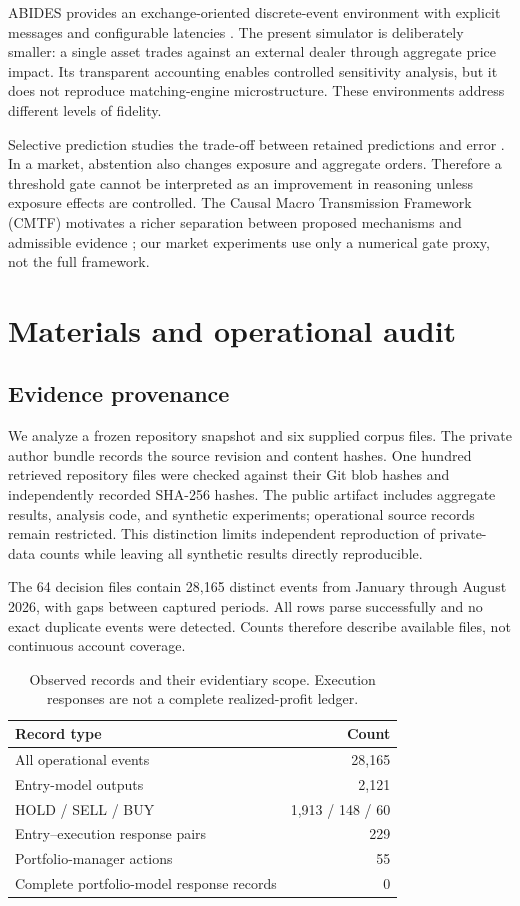 ABIDES provides an exchange-oriented discrete-event environment with explicit messages and configurable latencies \citep{byrd2019abides}. The present simulator is deliberately smaller: a single asset trades against an external dealer through aggregate price impact. Its transparent accounting enables controlled sensitivity analysis, but it does not reproduce matching-engine microstructure. These environments address different levels of fidelity.

Selective prediction studies the trade-off between retained predictions and error \citep{geifman2019selectivenet}. In a market, abstention also changes exposure and aggregate orders. Therefore a threshold gate cannot be interpreted as an improvement in reasoning unless exposure effects are controlled. The Causal Macro Transmission Framework (CMTF) motivates a richer separation between proposed mechanisms and admissible evidence \citep{olapade2026agentic}; our market experiments use only a numerical gate proxy, not the full framework.

\section{Materials and operational audit}
\subsection{Evidence provenance}
We analyze a frozen repository snapshot and six supplied corpus files. The private author bundle records the source revision and content hashes. One hundred retrieved repository files were checked against their Git blob hashes and independently recorded SHA-256 hashes. The public artifact includes aggregate results, analysis code, and synthetic experiments; operational source records remain restricted. This distinction limits independent reproduction of private-data counts while leaving all synthetic results directly reproducible.

The 64 decision files contain 28,165 distinct events from January through August 2026, with gaps between captured periods. All rows parse successfully and no exact duplicate events were detected. Counts therefore describe available files, not continuous account coverage.

\begin{table}[t]
\centering
\caption{Observed records and their evidentiary scope. Execution responses are not a complete realized-profit ledger.}
\begin{tabular}{@{}p{.48\linewidth}r@{}}
\toprule
Record type & Count\\\midrule
All operational events & 28,165\\
Entry-model outputs & 2,121\\
HOLD / SELL / BUY & 1,913 / 148 / 60\\
Entry--execution response pairs & 229\\
Portfolio-manager actions & 55\\
Complete portfolio-model response records & 0\\
\bottomrule
\end{tabular}
\label{tab:logs}
\end{table}


